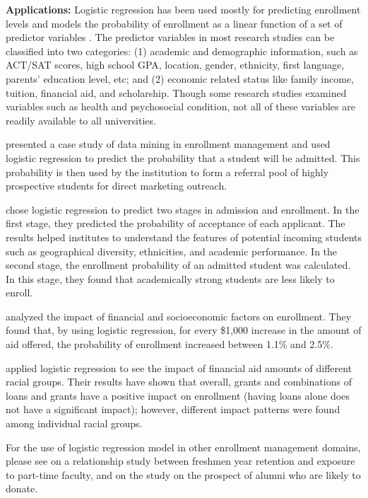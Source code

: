 \documentclass[12pt,english]{report}
\begin{document}
\vspace{0.25in}
\noindent \textbf{Applications:} Logistic regression has been used mostly for
predicting enrollment levels and models the probability of enrollment as a
linear function of a set of predictor variables \citep{lr_summary}. The
predictor variables in most research studies can be classified into two
categories: (1) academic and demographic information, such as ACT/SAT scores,
high school GPA, location, gender, ethnicity, first language, parents'
education level, etc; and (2) economic related status like family income,
tuition, financial aid, and scholarship. Though some research studies examined
variables such as health and psychosocial condition, not all of these variables
are readily available to all universities.

\citet{lr_1_chang} presented a case study of data mining in enrollment
management and used logistic regression to predict the probability that a
student will be admitted. This probability is then used by the institution to
form a referral pool of highly prospective students for direct marketing
outreach.

\citet{lr_2} chose logistic regression to predict two stages in admission and
enrollment. In the first stage, they predicted the probability of acceptance of
each applicant. The results helped institutes to understand the features of
potential incoming students such as geographical diversity, ethnicities, and
academic performance. In the second stage, the enrollment probability of an
admitted student was calculated. In this stage, they found that academically
strong students are less likely to enroll.

\citet{Braunstein1999} analyzed the impact of financial and socioeconomic
factors on enrollment. They found that, by using logistic regression, for every
\$1,000 increase in the amount of aid offered, the probability of enrollment
increased between 1.1\% and 2.5\%.

\citet{lr_aid2} applied logistic regression to see the impact of financial aid
amounts of different racial groups. Their results have shown that overall,
grants
and combinations of loans and grants have a positive impact on enrollment
(having loans alone does not have a significant impact); however, different
impact patterns were found among individual racial groups.

For the use of logistic regression model in other enrollment management
domains, please see \citet{lr_retention2} on a relationship study between
freshmen year retention and exposure to part-time faculty, and
\citep{lr_alumni1,lr_alumni2} on the study on the prospect of alumni who are
likely to donate.
\end{document}

